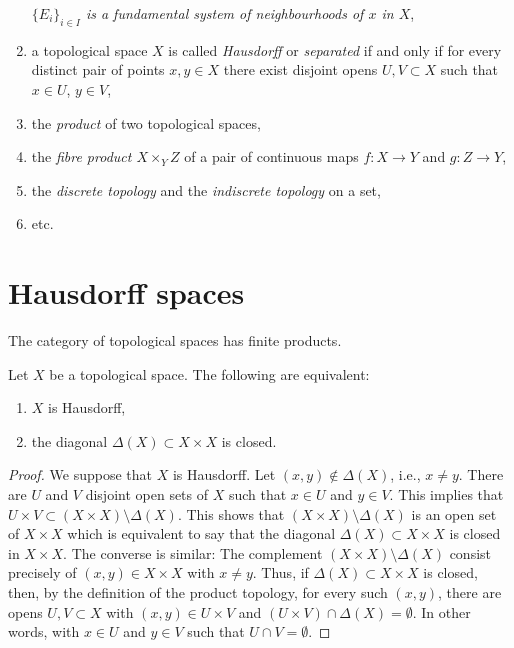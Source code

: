 \begin{enumerate}
\label{item-fundamental-system}
{\it $\{ E_i \}_{i \in I}$ is a fundamental system of neighbourhoods
of $x$ in $X$},
\item
\label{item-Hausdorff}
a topological space $X$ is called {\it Hausdorff} or {\it separated}
if and only if for every distinct pair of points $x, y \in X$ there exist
disjoint opens $U, V \subset X$ such that $x \in U$, $y \in V$,
\item the {\it product} of two topological spaces,
\label{item-product}
\item
\label{item-fibre-product}
the {\it fibre product $X \times_Y Z$} of a pair of continuous maps
$f : X \to Y$ and $g : Z \to Y$,
\item
\label{item-discrete-indiscrete}
the {\it discrete topology} and the {\it indiscrete topology} on a set,
\item etc.
\end{enumerate}



\section{Hausdorff spaces}
\label{section-Hausdorff}

\noindent
The category of topological spaces has finite products.

\begin{lemma}
\label{lemma-Hausdorff}
Let $X$ be a topological space. The following are equivalent:
\begin{enumerate}
\item $X$ is Hausdorff,
\item the diagonal $\Delta(X) \subset X \times X$ is closed.
\end{enumerate}
\end{lemma}

\begin{proof}
We suppose that $X$ is Hausdorff. Let $(x, y) \not \in \Delta(X)$, i.e.,
$x \neq y$. There are $U$ and $V$ disjoint open sets of $X$
such that $x \in U$ and $y \in V$. This implies that $U \times V \subset
(X \times X) \setminus \Delta(X) $. This shows that $ (X \times X) \setminus
\Delta(X)$ is an open set of $ X \times X$ which is equivalent to say that the
diagonal $\Delta(X) \subset X \times X$ is closed in $X \times X$.
The converse is similar:
The complement $(X \times X) \setminus \Delta(X)$ consist
precisely of $(x, y) \in X\times X$ with $ x \neq y$. Thus, if $ \Delta(X)
\subset X \times X$ is closed, then, by the definition of the product topology,
for every such $ (x, y)$, there are opens $U, V \subset X$ with $(x, y) \in
U \times V$ and $(U \times V)\cap \Delta(X) = \emptyset$. In other words, with
$x \in U$ and $y \in V$ such that $U \cap V = \emptyset$.
\end{proof}

